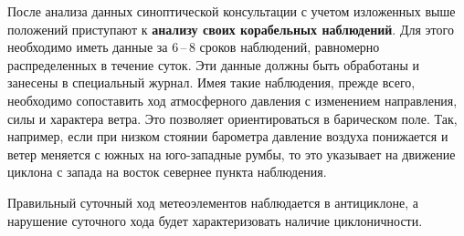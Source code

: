 \documentclass[a4paper, 12pt, twoside, final, book, russian, fittopage, cyremdash, openright]{ncc}
\newcommand{\otdo}{\,--\,}
\begin{document}
После анализа данных синоптической консультации с учетом изложенных
выше положений приступают к \textbf{анализу своих корабельных
  наблюдений}. Для этого необходимо иметь
данные за 6\otdo8 сроков наблюдений, равномерно распределенных в течение
суток. Эти данные должны быть обработаны и занесены в специальный
журнал. Имея такие наблюдения, прежде всего, необходимо сопоставить
ход атмосферного давления с изменением направления, силы и характера
ветра. Это позволяет ориентироваться в барическом поле. Так, например,
если при низком стоянии барометра давление воздуха понижается и ветер
меняется с южных на юго-западные румбы, то это указывает на движение
циклона с запада на восток севернее пункта наблюдения.

Правильный суточный ход метеоэлементов наблюдается в антициклоне, а
нарушение суточного хода будет характеризовать наличие циклоничности.
\end{document}
